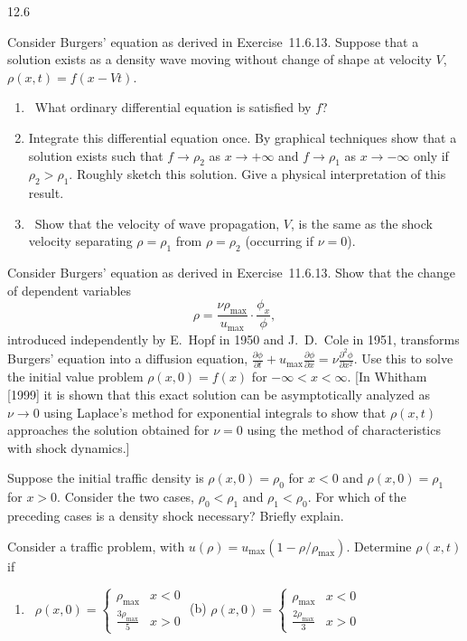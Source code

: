 \begin{exercises}{12.6}
\item \label{ex:12.6.14}
Consider Burgers' equation as derived in Exercise~11.6.13.  Suppose that a solution exists as a density wave moving without change of shape at velocity $V$, $\rho(x,t) = f(x - Vt)$.
\begin{enumerate}
\item[(a)]\starred\ What ordinary differential equation is satisfied by $f$?
\item[(b)] Integrate this differential equation once.  By graphical techniques show that a solution exists such that $f \to \rho_2$ as $x \to +\infty$ and $f \to \rho_1$ as $x \to -\infty$ only if $\rho_2 > \rho_1$.  Roughly sketch this solution.  Give a physical interpretation of this result.
\item[(c)]\starred\ Show that the velocity of wave propagation, $V$, is the same as the shock velocity separating $\rho = \rho_1$ from $\rho = \rho_2$ (occurring if $\nu = 0$).
\end{enumerate}

\item \label{ex:12.6.15}
Consider Burgers' equation as derived in Exercise~11.6.13.  Show that the change of dependent variables
\[
\rho = \frac{\nu\rho_{\max}}{u_{\max}}\cdot\frac{\phi_x}{\phi},
\]
introduced independently by E.~Hopf in 1950 and J.~D.~Cole in 1951, transforms Burgers' equation into a diffusion equation, $\frac{\partial\phi}{\partial t} + u_{\max}\frac{\partial\phi}{\partial x} = \nu\frac{\partial^2\phi}{\partial x^2}$.  Use this to solve the initial value problem $\rho(x,0) = f(x)$ for $-\infty < x < \infty$.  [In Whitham [1999] it is shown that this exact solution can be asymptotically analyzed as $\nu \to 0$ using Laplace's method for exponential integrals to show that $\rho(x,t)$ approaches the solution obtained for $\nu = 0$ using the method of characteristics with shock dynamics.]

\item \label{ex:12.6.16}
Suppose the initial traffic density is $\rho(x,0) = \rho_0$ for $x < 0$ and $\rho(x,0) = \rho_1$ for $x > 0$.  Consider the two cases, $\rho_0 < \rho_1$ and $\rho_1 < \rho_0$.  For which of the preceding cases is a density shock necessary?  Briefly explain.

\item \label{ex:12.6.17}
Consider a traffic problem, with $u(\rho) = u_{\max}(1 - \rho/\rho_{\max})$.  Determine $\rho(x,t)$ if
\begin{enumerate}
\item[(a)]\starred\ $\rho(x,0) = \begin{cases} \rho_{\max} & x < 0 \\ \frac{3\rho_{\max}}{5} & x > 0 \end{cases}$ \hfill (b) $\rho(x,0) = \begin{cases} \rho_{\max} & x < 0 \\ \frac{2\rho_{\max}}{3} & x > 0 \end{cases}$
\end{enumerate}


\end{exercises}
